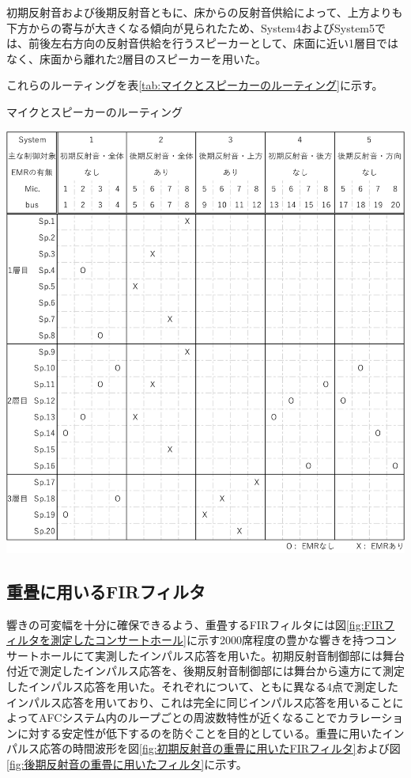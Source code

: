 \documentclass[11pt,a4j]{jreport}
\begin{document}
初期反射音および後期反射音ともに、床からの反射音供給によって、上方よりも下方からの寄与が大きくなる傾向が見られたため、System4およびSystem5では、前後左右方向の反射音供給を行うスピーカーとして、床面に近い1層目ではなく、床面から離れた2層目のスピーカーを用いた。

これらのルーティングを表\ref{tab:マイクとスピーカーのルーティング}に示す。

\newpage
{}
\begin{table}[H]
  \centering
  \caption{マイクとスピーカーのルーティング}
  \label{tab:マイクとスピーカーのルーティング}
  \includegraphics[width=1\linewidth]{images/experimentField/micSpRooting.pdf}
\end{table}

\newpage
\subsection*{重畳に用いるFIRフィルタ}
響きの可変幅を十分に確保できるよう、重畳するFIRフィルタには図\ref{fig:FIRフィルタを測定したコンサートホール}に示す2000席程度の豊かな響きを持つコンサートホールにて実測したインパルス応答を用いた。初期反射音制御部には舞台付近で測定したインパルス応答を、後期反射音制御部には舞台から遠方にて測定したインパルス応答を用いた。それぞれについて、ともに異なる4点で測定したインパルス応答を用いており、これは完全に同じインパルス応答を用いることによってAFCシステム内のループごとの周波数特性が近くなることでカラレーションに対する安定性が低下するのを防ぐことを目的としている。重畳に用いたインパルス応答の時間波形を図\ref{fig:初期反射音の重畳に用いたFIRフィルタ}および図\ref{fig:後期反射音の重畳に用いたフィルタ}に示す。
\end{document}
